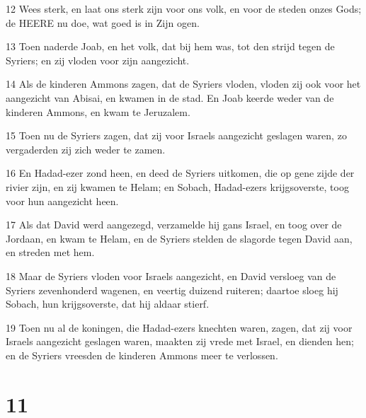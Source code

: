 \par 12 Wees sterk, en laat ons sterk zijn voor ons volk, en voor de steden onzes Gods; de HEERE nu doe, wat goed is in Zijn ogen.
\par 13 Toen naderde Joab, en het volk, dat bij hem was, tot den strijd tegen de Syriers; en zij vloden voor zijn aangezicht.
\par 14 Als de kinderen Ammons zagen, dat de Syriers vloden, vloden zij ook voor het aangezicht van Abisai, en kwamen in de stad. En Joab keerde weder van de kinderen Ammons, en kwam te Jeruzalem.
\par 15 Toen nu de Syriers zagen, dat zij voor Israels aangezicht geslagen waren, zo vergaderden zij zich weder te zamen.
\par 16 En Hadad-ezer zond heen, en deed de Syriers uitkomen, die op gene zijde der rivier zijn, en zij kwamen te Helam; en Sobach, Hadad-ezers krijgsoverste, toog voor hun aangezicht heen.
\par 17 Als dat David werd aangezegd, verzamelde hij gans Israel, en toog over de Jordaan, en kwam te Helam, en de Syriers stelden de slagorde tegen David aan, en streden met hem.
\par 18 Maar de Syriers vloden voor Israels aangezicht, en David versloeg van de Syriers zevenhonderd wagenen, en veertig duizend ruiteren; daartoe sloeg hij Sobach, hun krijgsoverste, dat hij aldaar stierf.
\par 19 Toen nu al de koningen, die Hadad-ezers knechten waren, zagen, dat zij voor Israels aangezicht geslagen waren, maakten zij vrede met Israel, en dienden hen; en de Syriers vreesden de kinderen Ammons meer te verlossen.

\chapter{11}

